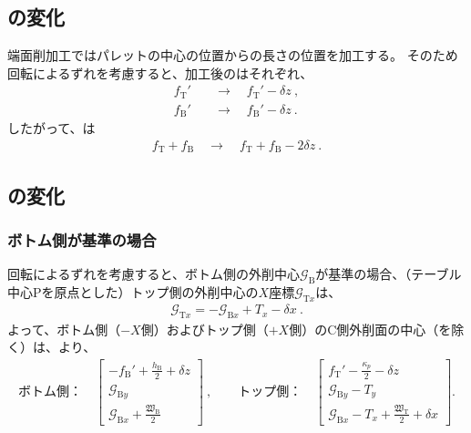 \subsection{\WorkTotalLength の変化}
端面削加工ではパレットの中心の位置から\ReAlocationLength の長さの位置を加工する。
そのため回転によるずれを考慮すると、加工後の\ReAlocationLength はそれぞれ、
\begin{align*}
  f_\mathrm T' &\quad\longrightarrow\quad f_\mathrm T'-\delta z\ ,\\
  f_\mathrm B' &\quad\longrightarrow\quad f_\mathrm B'-\delta z\ .
\end{align*}
したがって、\WorkTotalLength は
\begin{align*}
  f_\mathrm T+f_\mathrm B \quad\longrightarrow\quad f_\mathrm T+f_\mathrm B-2\delta z\ .
\end{align*}


\clearpage
\subsection{\CenterlineEndFaceDif の変化}

\subsubsection{ボトム側が基準の場合}
回転によるずれを考慮すると、ボトム側の外削中心$\mathcal G_\mathrm B$が基準の場合、（テーブル中心Pを原点とした）トップ側の外削中心の$X$座標$\mathcal G_{\mathrm Tx}$は、
\begin{align*}
  \mathcal G_{\mathrm Tx} = -\mathcal G_{\mathrm Bx}+T_x-\delta x\ .
\end{align*}
よって、ボトム側（$-X$側）およびトップ側（$+X$側）のC側外削面の中心（\Keyway を除く）は、より、
\begin{align*}
  \text{ボトム側：}\quad
  \left[
    \begin{array}{c}
      \displaystyle -f_\mathrm B'+\frac{h_\mathrm B}2+\delta z\\[5pt]
      \mathcal G_{\mathrm By}\\[3pt]
      \displaystyle \mathcal G_{\mathrm Bx}+\frac{\mathfrak W_\mathrm B}2
    \end{array}
    \right]~, \qquad
  \text{トップ側：}\quad
  \left[
    \begin{array}{c}
      \displaystyle f_\mathrm T'-\frac{\kappa_p}2-\delta z\\[5pt]
      \mathcal G_{\mathrm By}-T_y\\[3pt]
      \displaystyle \mathcal G_{\mathrm Bx}-T_x+\frac{\mathfrak W_\mathrm T}2+\delta x
    \end{array}
  \right].
\end{align*}

